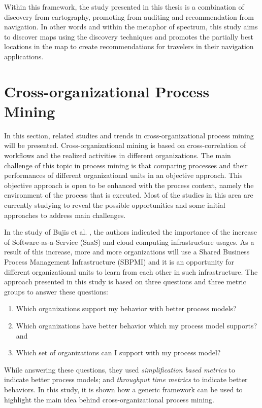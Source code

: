 Within this framework, the study presented in this thesis is a combination of discovery from cartography, promoting from auditing and recommendation from navigation. In other words and within the metaphor of spectrum, this study aims to discover maps using the discovery techniques and promotes the partially best locations in the map to create recommendations for travelers in their navigation applications. 
    

\section{Cross-organizational Process Mining}
\label{sec:cross-organizational-process-mining}
In this section, related studies and trends in cross-organizational process mining will be presented. Cross-organizational mining is based on cross-correlation of workflows and the realized activities in different organizations. The main challenge of this topic in process mining is that comparing processes and their performances of different organizational units in an objective approach. This objective approach is open to be enhanced with the process context, namely the environment of the process that is executed. Most of the studies in this area are currently studying to reveal the possible opportunities and some initial approaches to address main challenges.

In the study of Bujis et al. \cite{buijs2012towards}, the authors indicated the importance of the increase of Software-as-a-Service (SaaS) and cloud computing infrastructure usages. As a result of this increase, more and more organizations will use a Shared Business Process Management Infrastructure (SBPMI) and it is an opportunity for different organizational units to learn from each other in such infrastructure. The approach presented in this study is based on three questions and three metric groups to answer these questions:
\begin{enumerate}
\item Which organizations support my behavior with better process models?
\item Which organizations have better behavior which my process model supports? and
\item Which set of organizations can I support with my process model?
\end{enumerate} While answering these questions, they used \textit{simplification based metrics} to indicate better process models; and \textit{throughput time metrics} to indicate better behaviors. In this study, it is shown how a generic framework can be used to highlight the main idea behind cross-organizational process mining. 


